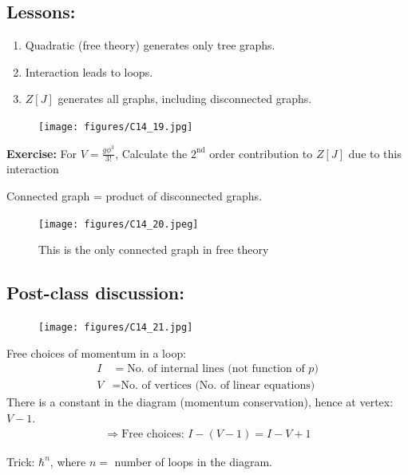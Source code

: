 \documentclass[14pt]{article} %
\begin{document}
\subsection*{Lessons:}
\begin{enumerate}
\item Quadratic (free theory) generates only tree graphs.
\item Interaction leads to loops.
\item $Z[J]$ generates all graphs, including disconnected graphs.
\end{enumerate}
\begin{figure}[H]
    \centering
    \texttt{[image: figures/C14\_19.jpg]}
    \caption*{}
    \label{fig:placeholder}
\end{figure}
\begin{framed}
\noindent
\textbf{Exercise:} For $V=\frac{{g \phi^3}}{3!}$, Calculate the $2^{\text{nd}}$ order contribution to $Z[J]$ due to this interaction
\end{framed}
Connected graph = product of disconnected graphs.
\vspace{1cm}
\begin{figure}[H]
    \centering
    \texttt{[image: figures/C14\_20.jpeg]}
    \caption*{This is the only connected graph in free theory}
    \label{fig:placeholder}
\end{figure}
\newpage
\subsection*{Post-class discussion:}
\begin{figure}[H]
    \centering
    \texttt{[image: figures/C14\_21.jpg]}
    \caption*{}
    \label{fig:placeholder}
\end{figure}
\vspace{-1.2cm}
Free choices of momentum in a loop:
\begin{align*}
I &= \text{No. of internal lines (not function of $p$)} \\
V &= \text{No. of vertices (No. of linear equations)}
\end{align*}
There is a constant in the diagram (momentum conservation), hence at vertex: $V - 1$.
\begin{align*}
\Rightarrow \text{Free choices: } I - (V - 1) = I - V + 1
\end{align*}

Trick: $\hbar^n$, where $n =$ number of loops in the diagram.


\end{document}
